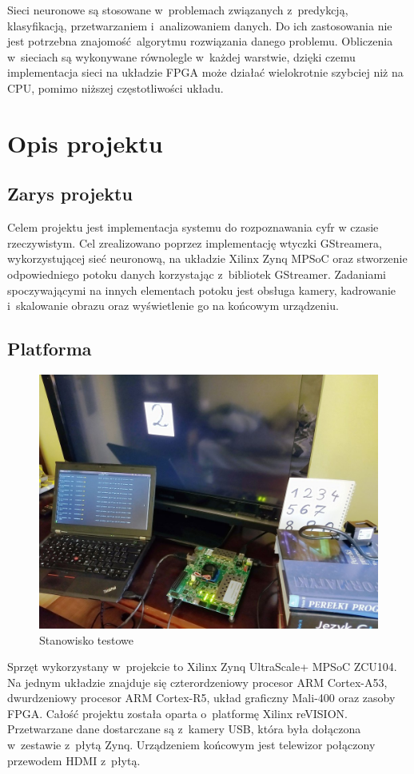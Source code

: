 \documentclass[12pt, oneside, a4paper]{article}
\begin{document}
Sieci neuronowe są stosowane w~problemach
związanych z~predykcją, klasyfikacją, przetwarzaniem i~analizowaniem
danych. Do ich zastosowania nie jest potrzebna znajomość algorytmu rozwiązania
danego problemu. Obliczenia w~sieciach są wykonywane równolegle w~każdej
warstwie, dzięki czemu implementacja sieci na układzie FPGA może działać
wielokrotnie szybciej niż na CPU, pomimo niższej częstotliwości układu.

\newpage
\section{Opis projektu}

\subsection{Zarys projektu}
Celem projektu jest implementacja systemu do rozpoznawania cyfr
w czasie rzeczywistym. Cel zrealizowano poprzez implementację
wtyczki GStreamera, wykorzystującej sieć neuronową, na układzie
Xilinx Zynq MPSoC oraz stworzenie odpowiedniego potoku danych
korzystając z~bibliotek GStreamer. Zadaniami spoczywającymi na innych
elementach potoku jest obsługa kamery,
kadrowanie i~skalowanie obrazu oraz wyświetlenie go na końcowym urządzeniu.

\subsection{Platforma}
\begin{figure}[h]
  \centering
  \includegraphics[width=0.9\linewidth]{figures/place_of_work_small.jpg}
  \caption{Stanowisko testowe}\label{fig:stanowisko}
\end{figure}
Sprzęt wykorzystany w~projekcie to Xilinx Zynq UltraScale+ MPSoC ZCU104.
Na jednym układzie znajduje się czterordzeniowy procesor
ARM \mbox{Cortex-A53},
dwurdzeniowy procesor ARM \mbox{Cortex-R5},
układ graficzny \mbox{Mali-400} oraz zasoby FPGA.
Całość projektu została oparta o~platformę Xilinx reVISION. Przetwarzane
dane dostarczane są z~kamery USB, która była dołączona w~zestawie z~płytą Zynq.
Urządzeniem końcowym jest telewizor połączony przewodem HDMI z~płytą.
\end{document}
